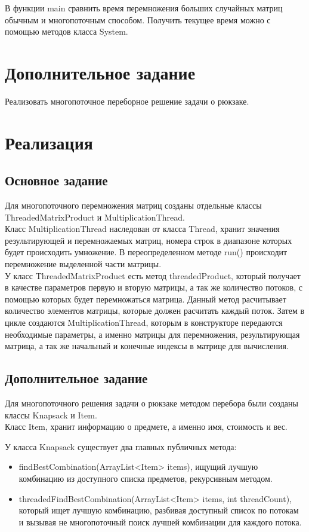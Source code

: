 \documentclass{article}
\begin{document}
В функции main сравнить время перемножения больших случайных матриц обычным и многопоточным способом. Получить текущее время можно с помощью методов класса System.


\section{Дополнительное задание}
Реализовать многопоточное переборное решение задачи о рюкзаке.

\section{Реализация}
\subsection{Основное задание}
Для многопоточного перемножения матриц созданы отдельные классы ThreadedMatrixProduct и MultiplicationThread.\\

Класс MultiplicationThread наследован от класса Thread, хранит значения результирующей и перемножаемых матриц, номера строк в диапазоне которых будет происходить умножение.  В переопределенном методе run() происходит перемножение выделенной части матрицы.\\

У класс ThreadedMatrixProduct есть метод threadedProduct, который получает в качестве параметров первую и вторую матрицы, а так же количество потоков, с помощью которых будет перемножаться матрица.
Данный метод расчитывает количество элементов матрицы, которые должен расчитать каждый поток. Затем в цикле создаются MultiplicationThread, которым в конструкторе передаются необходимые параметры, а именно матрицы для перемножения, результирующая матрица, а так же начальный и конечные индексы в матрице для вычисления.  

\subsection{Дополнительное задание}
Для многопоточного решения задачи о рюкзаке методом перебора были созданы классы Knapsack и Item. \\
Класс Item, хранит информацию о предмете, а именно имя, стоимость и вес.

У класса Knapsack существует два главных публичных метода:
\begin{itemize}
	\item findBestCombination(ArrayList<Item> items), ищущий лучшую комбинацию из доступного списка предметов, рекурсивным методом. 
	\item threadedFindBestCombination(ArrayList<Item> items, int threadCount), который ищет лучшую комбинацию, разбивая доступный список по потокам и вызывая не многопоточный поиск лучшей комбинации для каждого потока. 
\end{itemize}
\end{document}
